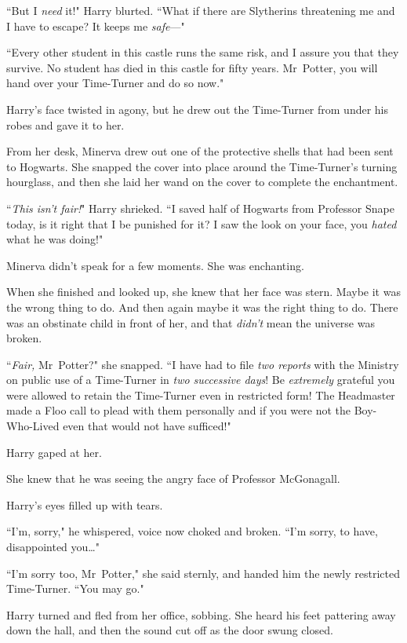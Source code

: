 ``But I \emph{need} it!" Harry blurted. ``What if there are Slytherins threatening me and I have to escape? It keeps me \emph{safe}—"

``Every other student in this castle runs the same risk, and I assure you that they survive. No student has died in this castle for fifty years. Mr~Potter, you will hand over your Time-Turner and do so now."

Harry's face twisted in agony, but he drew out the Time-Turner from under his robes and gave it to her.

From her desk, Minerva drew out one of the protective shells that had been sent to Hogwarts. She snapped the cover into place around the Time-Turner's turning hourglass, and then she laid her wand on the cover to complete the enchantment.

``\emph{This isn't fair!}" Harry shrieked. ``I saved half of Hogwarts from Professor Snape today, is it right that I be punished for it? I saw the look on your face, you \emph{hated} what he was doing!"

Minerva didn't speak for a few moments. She was enchanting.

When she finished and looked up, she knew that her face was stern. Maybe it was the wrong thing to do. And then again maybe it was the right thing to do. There was an obstinate child in front of her, and that \emph{didn't} mean the universe was broken.

``\emph{Fair,} Mr~Potter?" she snapped. ``I have had to file \emph{two reports} with the Ministry on public use of a Time-Turner in \emph{two successive days}! Be \emph{extremely} grateful you were allowed to retain the Time-Turner even in restricted form! The Headmaster made a Floo call to plead with them personally and if you were not the Boy-Who-Lived even that would not have sufficed!"

Harry gaped at her.

She knew that he was seeing the angry face of Professor McGonagall.

Harry's eyes filled up with tears.

``I'm, sorry," he whispered, voice now choked and broken. ``I'm sorry, to have, disappointed you{\ldots}"

``I'm sorry too, Mr~Potter," she said sternly, and handed him the newly restricted Time-Turner. ``You may go."

Harry turned and fled from her office, sobbing. She heard his feet pattering away down the hall, and then the sound cut off as the door swung closed.

